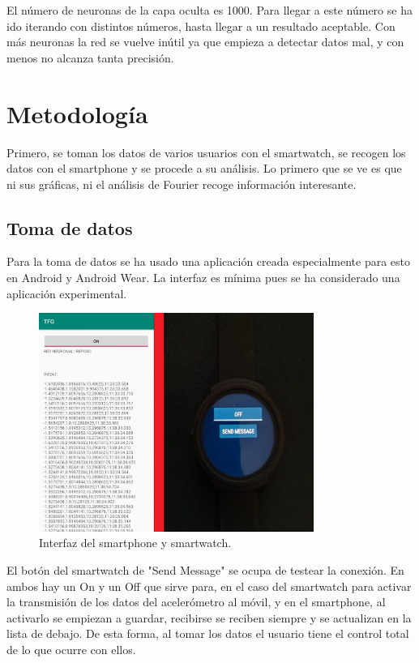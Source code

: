 \documentclass[12pt]{article}
\numberwithin{equation}{section}
\begin{document}
El número de neuronas de la capa oculta es 1000. Para llegar a este número se ha ido iterando con distintos números, hasta llegar a un resultado aceptable. Con más neuronas la red se vuelve inútil ya que empieza a detectar datos mal, y con menos no alcanza tanta precisión.


\newpage
\section{Metodología}
Primero, se toman los datos de varios usuarios con el smartwatch, se recogen los datos con el smartphone y se procede a su análisis. Lo primero que se ve es que ni sus gráficas, ni el análisis de Fourier recoge información interesante.

\subsection{Toma de datos}

Para la toma de datos se ha usado una aplicación creada especialmente para esto en Android y Android Wear. La interfaz es mínima pues se ha considerado una aplicación experimental.

\begin{figure}[h]
    \centering
    \includegraphics[width=0.8\textwidth]{Interfaces.jpg}
    \caption{Interfaz del smartphone y smartwatch.}
    \label{fig:mesh2}
\end{figure}

El botón del smartwatch de "Send Message" se ocupa de testear la conexión. En ambos hay un On y un Off que sirve para, en el caso del smartwatch para activar la transmisión de los datos del acelerómetro al móvil, y en el smartphone, al activarlo se empiezan a guardar, recibirse se reciben siempre y se actualizan en la lista de debajo. De esta forma, al tomar los datos el usuario tiene el control total de lo que ocurre con ellos.
\end{document}
